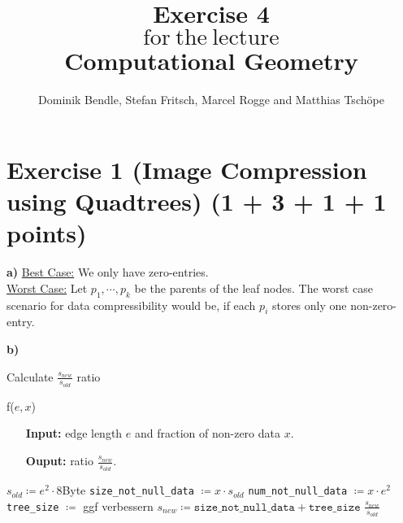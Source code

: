 \documentclass[english, fontsize=12pt, paper=a4, twoside=false, draft=true, pagesize=auto, version=last, DIV=16]{scrartcl}
\theoremstyle{break}
\begin{document}
\title{
\vspace*{-10mm}
Exercise 4 \\[-3pt]
{\Large $\mathrm{for \ the \ lecture}$} \\[-3pt]
{\LARGE \textbf{Computational Geometry}}
}
\author{Dominik Bendle, Stefan Fritsch, Marcel Rogge and Matthias Tschöpe}
\maketitle
\vspace*{-10mm}

\section*{\large Exercise 1 (Image Compression using Quadtrees) {\normalsize \hfill (1 + 3 + 1 + 1 points)}}
\textbf{a)} 
\underline{Best Case:} We only have zero-entries. \\
\underline{Worst Case:} Let $p_1, \cdots, p_k$ be the parents of the leaf nodes. The worst case scenario for data compressibility would be, if each $p_i$ stores only one non-zero-entry. \par
\vspace*{3mm}


\textbf{b)} 
\begin{algorithm}
\caption{Calculate $\frac{s_{new}}{s_{old}}$ ratio}
\label{Alg f} \par
\medskip
{f($e, x$)} \par
\vspace*{-3mm}
\begin{itemize}[leftmargin=20mm]
\item[\textbf{Input:}] edge length $e$ and fraction of non-zero data $x$. \\[-20pt]
\item[\textbf{Ouput:}] ratio $\frac{s_{new}}{s_{old}}$.
\end{itemize} \par
\vspace*{-3mm}
\begin{algorithmic}[1]
	\State $s_{old} \coloneqq e^2 \cdot 8$Byte
	\State \texttt{size\_not\_null\_data} $\coloneqq x \cdot s_{old}$
	\State \texttt{num\_not\_null\_data} $\coloneqq x \cdot e^2$
	\State \texttt{tree\_size} $\coloneqq$ {\color{red} ggf verbessern}
	\State $s_{new} \coloneqq \texttt{size\_not\_null\_data} + \texttt{tree\_size}$ 
   	\State \Return $\frac{s_{new}}{s_{old}}$
\end{algorithmic}
\end{algorithm}\par
\end{document}
